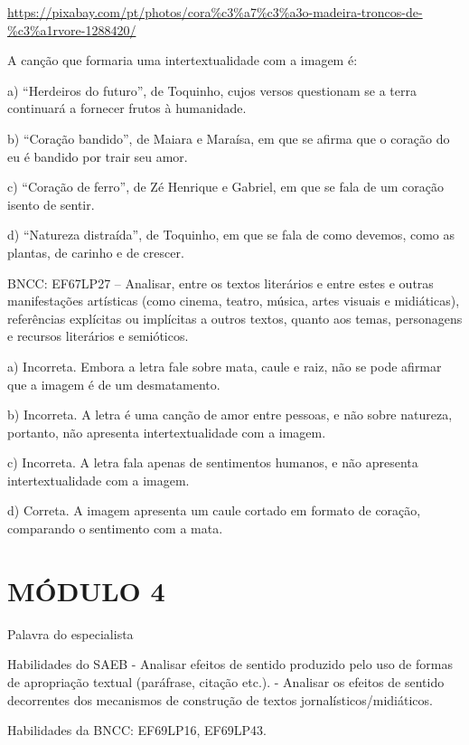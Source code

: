{\url{https://pixabay.com/pt/photos/cora\%c3\%a7\%c3\%a3o-madeira-troncos-de-\%c3\%a1rvore-1288420/}

A canção que formaria uma intertextualidade com a imagem é:

a) ``Herdeiros do futuro'', de Toquinho, cujos versos questionam se a
terra continuará a fornecer frutos à humanidade.

b) ``Coração bandido'', de Maiara e Maraísa, em que se afirma que o
coração do eu é bandido por trair seu amor.

c) ``Coração de ferro'', de Zé Henrique e Gabriel, em que se fala de um
coração isento de sentir.

d) ``Natureza distraída'', de Toquinho, em que se fala de como devemos,
como as plantas, de carinho e de crescer.

BNCC: EF67LP27 -- Analisar, entre os textos literários e entre estes e
outras manifestações artísticas (como cinema, teatro, música, artes
visuais e midiáticas), referências explícitas ou implícitas a outros
textos, quanto aos temas, personagens e recursos literários e
semióticos.

a) Incorreta. Embora a letra fale sobre mata, caule e raiz, não se pode
afirmar que a imagem é de um desmatamento.

b) Incorreta. A letra é uma canção de amor entre pessoas, e não sobre
natureza, portanto, não apresenta intertextualidade com a imagem.

c) Incorreta. A letra fala apenas de sentimentos humanos, e não
apresenta intertextualidade com a imagem.

d) Correta. A imagem apresenta um caule cortado em formato de coração,
comparando o sentimento com a mata.

\section{MÓDULO 4}

Palavra do especialista

Habilidades do SAEB - Analisar efeitos de sentido produzido pelo uso de
formas de apropriação textual (paráfrase, citação etc.). - Analisar os
efeitos de sentido decorrentes dos mecanismos de construção de textos
jornalísticos/midiáticos.

Habilidades da BNCC: EF69LP16, EF69LP43.

}
